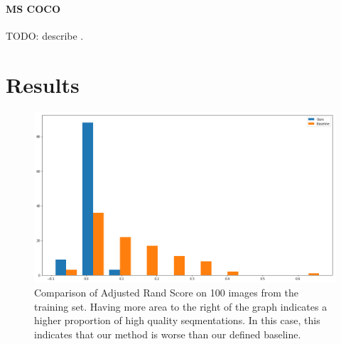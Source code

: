 \documentclass[twocolumn]{article}
\newcommand{\todo}[1]{}
\renewcommand{\todo}[1]{{\color{red} TODO: {#1}}}
\newcommand{\seclab}[1]{\label{sec:#1}}
\newcommand{\figlab}[1]{\label{fig:#1}}
\begin{document}
\paragraph{MS COCO} \todo{describe} \cite{lin2014microsoft}.

\section{Results}\seclab{results}

\begin{figure}
  \centering

  \includegraphics[width=\linewidth]{figs/bars.png}

  \caption{Comparison of Adjusted Rand Score on 100 images from the training set. Having more area to the right of the graph
indicates a higher proportion of high quality seqmentations. In this case, this indicates that our method is worse than our
defined baseline.
  }
  \figlab{bars}

\end{figure}
\end{document}
